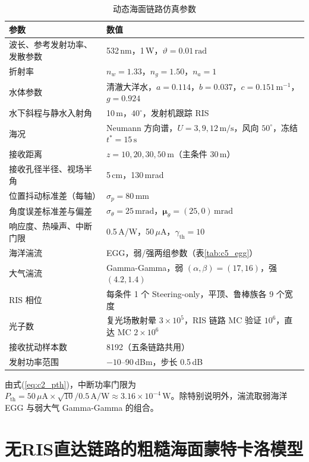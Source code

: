 \begin{table}[htbp]
\caption{动态海面链路仿真参数}
\label{tab:c5_param}
\centering
\begin{tabular}{ll}
\toprule
参数 & 数值 \\
\midrule
波长、参考发射功率、发散参数 & 532\,nm，1\,W，$\vartheta=0.01\,\mathrm{rad}$ \\
折射率 & $n_w=1.33$，$n_g=1.50$，$n_a=1$ \\
水体参数 & 清澈大洋水，$a=0.114$，$b=0.037$，$c=0.151\,\mathrm{m^{-1}}$，$g=0.924$ \\
水下斜程与静水入射角 & 10\,m，$40^\circ$，发射机跟踪 RIS \\
海况 & Neumann 方向谱，$U=3,9,12\,\mathrm{m/s}$，风向 $50^\circ$，冻结 $t^\ast=15\,\mathrm s$ \\
接收距离 & $z=10,20,30,50\,\mathrm m$（主条件 30\,m） \\
接收孔径半径、视场半角 & 5\,cm，130\,mrad \\
位置抖动标准差（每轴） & $\sigma_p=80\,\mathrm{mm}$ \\
角度误差标准差与偏差 & $\sigma_\theta=25\,\mathrm{mrad}$，$\boldsymbol\mu_\theta=(25,0)\,\mathrm{mrad}$ \\
响应度、热噪声、中断门限 & 0.5\,A/W，50\,$\mu$A，$\gamma_{\mathrm{th}}=10$ \\
海洋湍流 & EGG，弱/强两组参数（表\ref{tab:c5_egg}） \\
大气湍流 & Gamma-Gamma，弱 $(\alpha,\beta)=(17,16)$，强 $(4.2,1.4)$ \\
RIS 相位 & 每条件 1 个 Steering-only，平顶、鲁棒族各 9 个宽度 \\
光子数 & 复光场散射晕 $3\times10^5$，RIS 链路 MC 验证 $10^6$，直达 MC $2\times10^6$ \\
接收扰动样本数 & 8192（五条链路共用） \\
发射功率范围 & $-10$--90\,dBm，步长 0.5\,dB \\
\bottomrule
\end{tabular}
\end{table}

由式(\ref{eq:c2_pth})，中断功率门限为 $P_{\mathrm{th}}=50\,\mu\mathrm A\times\sqrt{10}/0.5\,\mathrm{A/W}\approx3.16\times10^{-4}\,\mathrm W$。除特别说明外，湍流取弱海洋 EGG 与弱大气 Gamma-Gamma 的组合。

\section{无RIS直达链路的粗糙海面蒙特卡洛模型}
\label{sec:c5_direct}

